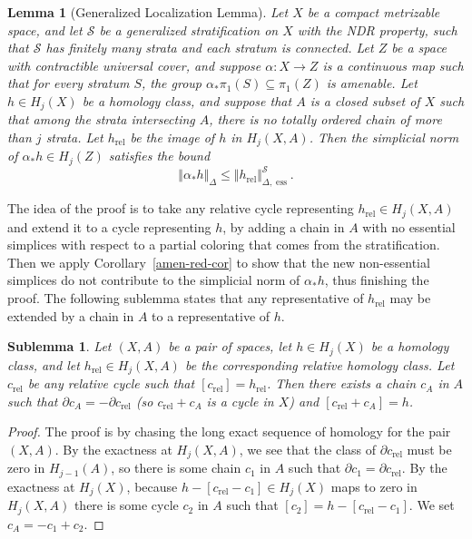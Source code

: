 \documentclass[psamsfonts]{amsart}
\newtheorem{lemma}[theorem]{Lemma}
\newtheorem{sublemma}[theorem]{Sublemma}
\theoremstyle{remark}
\newcommand{\del}{\partial}
\DeclareMathOperator{\ess}{ess}
\DeclareMathOperator{\rel}{rel}
\begin{document}
\begin{lemma}[Generalized Localization Lemma]\label{gen-loc}
Let $X$ be a compact metrizable space, and let $\mathcal{S}$ be a generalized stratification on $X$ with the NDR property, such that $\mathcal{S}$ has finitely many strata and each stratum is connected.  Let $Z$ be a space with contractible universal cover, and suppose $\alpha : X \rightarrow Z$ is a continuous map such that for every stratum $S$, the group $\alpha_*\pi_1(S) \subseteq \pi_1(Z)$ is amenable.  Let $h \in H_j(X)$ be a homology class, and suppose that $A$ is a closed subset of $X$ such that among the strata intersecting $A$, there is no totally ordered chain of more than $j$ strata.  Let $h_{\rel}$ be the image of $h$ in $H_j(X, A)$.  Then the simplicial norm of $\alpha_*h \in H_j(Z)$ satisfies the bound
\[\Vert \alpha_*h \Vert_{\Delta} \leq \Vert h_{\rel} \Vert_{\Delta, \ess}^{\mathcal{S}}.\]
\end{lemma}

The idea of the proof is to take any relative cycle representing $h_{\rel} \in H_j(X, A)$ and extend it to a cycle representing $h$, by adding a chain in $A$ with no essential simplices with respect to a partial coloring that comes from the stratification.  Then we apply Corollary~\ref{amen-red-cor} to show that the new non-essential simplices do not contribute to the simplicial norm of $\alpha_* h$, thus finishing the proof.  The following sublemma states that any representative of $h_{\rel}$ may be extended by a chain in $A$ to a representative of $h$.

\begin{sublemma}\label{les}
Let $(X, A)$ be a pair of spaces, let $h \in H_j(X)$ be a homology class, and let $h_{\rel} \in H_j(X, A)$ be the corresponding relative homology class.  Let $c_{\rel}$ be any relative cycle such that $[c_{\rel}] = h_{\rel}$.  Then there exists a chain $c_A$ in $A$ such that $\del c_A = -\del c_{\rel}$ (so $c_{\rel} + c_A$ is a cycle in $X$) and $[c_{\rel} + c_A] = h$.
\end{sublemma}

\begin{proof}
The proof is by chasing the long exact sequence of homology for the pair $(X, A)$.  By the exactness at $H_j(X, A)$, we see that the class of $\del c_{\rel}$ must be zero in $H_{j-1}(A)$, so there is some chain $c_1$ in $A$ such that $\del c_1 = \del c_{\rel}$.  By the exactness at $H_j(X)$, because $h - [c_{\rel} - c_1] \in H_j(X)$ maps to zero in $H_j(X, A)$ there is some cycle $c_2$ in $A$ such that $[c_2] = h - [c_{\rel} - c_1]$.  We set $c_A = -c_1 + c_2$.
\end{proof}
\end{document}

